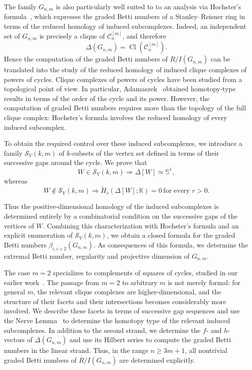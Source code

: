 \documentclass[12pt,reqno]{amsart}
\theoremstyle{definition}
\numberwithin{equation}{section}
\def\C{\mathcal{C}}
\def\K{\mathbb{K}}
\begin{document}
The family $G_{n,m}$ is also particularly well suited to to an analysis
via  Hochster's
formula~\cite{hoch}, which expresses the graded Betti numbers of a
Stanley--Reisner ring in terms of the reduced homology of induced
subcomplexes. Indeed, an independent set of $G_{n,m}$ is precisely a clique
of $\C_n^{[m]}$, and therefore
\[
\Delta(G_{n,m})=\operatorname{Cl}(\C_n^{[m]}).
\]
Hence the computation of the graded Betti numbers of $R/I(G_{n,m})$
can be translated into the study of the reduced homology of induced
clique complexes of powers of cycles. Clique complexes of powers of cycles have been studied from a
topological point of view. In particular, Adamaszek~\cite{Adamaszek}
obtained homotopy-type results in terms of the order of the cycle and
its power. However, the
computation of graded Betti numbers requires more than the topology of
the full clique complex: Hochster's formula involves the reduced
homology of every induced subcomplex.

To obtain the required control over these induced subcomplexes, we
introduce a family $\mathcal{S}_V(k,m)$ of $k$-subsets of the vertex
set defined in terms of their successive gaps around the cycle.
We prove that
\[
W\in\mathcal{S}_V(k,m)
\Longrightarrow
\Delta[W]\simeq\mathbb S^1,
\]
whereas
\[
W\notin\mathcal{S}_V(k,m)
\Longrightarrow
\widetilde H_r(\Delta[W];\K)=0
~\text{for every }r>0.
\]

Thus the positive-dimensional homology of the induced subcomplexes is
determined entirely by a combinatorial condition on the successive
gaps of the vertices of $W$. Combining this characterization with
Hochster's formula and an explicit enumeration of
$\mathcal{S}_V(k,m)$, we obtain a closed formula for the graded Betti
numbers $\beta_{i,i+2}(G_{n,m})$. As consequences of this formula, we determine the extremal Betti
number, regularity and projective dimension of $G_{n,m}$.

The case $m=2$ specializes to complements of squares of cycles, studied
in our earlier work~\cite{RatherSquare}. The passage from $m=2$ to
arbitrary $m$ is not merely formal: for general $m$, the relevant clique
complexes are higher-dimensional, and the structure of their facets and
their intersections becomes considerably more involved. We describe
these facets in terms of successive gap sequences and use the Nerve
Lemma~\cite{Kozlov} to determine the homotopy type of the relevant
induced subcomplexes. In addition to the
second strand, we determine the $f$- and $h$-vectors of
$\Delta(G_{n,m})$ and use its Hilbert series to compute the graded
Betti numbers in the linear strand. Thus, in the range $n\geq3m+1$, all nontrivial graded Betti numbers of
$R/I(G_{n,m})$ are determined explicitly.
\end{document}
